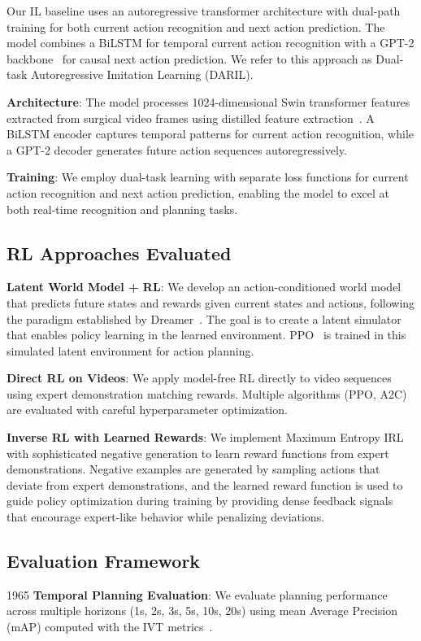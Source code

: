 \documentclass[runningheads]{llncs}
\begin{document}
Our IL baseline uses an autoregressive transformer architecture with dual-path training for both current action recognition and next action prediction. The model combines a BiLSTM for temporal current action recognition with a GPT-2 backbone~\cite{radford2019language} for causal next action prediction. We refer to this approach as Dual-task Autoregressive Imitation Learning (DARIL).

\textbf{Architecture}: The model processes 1024-dimensional Swin transformer features~\cite{liu2021swin} extracted from surgical video frames using distilled feature extraction~\cite{yamlahi2023self}. A BiLSTM encoder captures temporal patterns for current action recognition, while a GPT-2 decoder generates future action sequences autoregressively.

\textbf{Training}: We employ dual-task learning with separate loss functions for current action recognition and next action prediction, enabling the model to excel at both real-time recognition and planning tasks.

\subsection{RL Approaches Evaluated}

\textbf{Latent World Model + RL}: We develop an action-conditioned world model that predicts future states and rewards given current states and actions, following the paradigm established by Dreamer~\cite{hafner2020dream}. The goal is to create a latent simulator that enables policy learning in the learned environment. PPO~\cite{schulman2017proximal} is trained in this simulated latent environment for action planning.

\textbf{Direct RL on Videos}: We apply model-free RL directly to video sequences using expert demonstration matching rewards. Multiple algorithms (PPO, A2C) are evaluated with careful hyperparameter optimization.

\textbf{Inverse RL with Learned Rewards}: We implement Maximum Entropy IRL~\cite{ziebart2008maximum} with sophisticated negative generation to learn reward functions from expert demonstrations. Negative examples are generated by sampling actions that deviate from expert demonstrations, and the learned reward function is used to guide policy optimization during training by providing dense feedback signals that encourage expert-like behavior while penalizing deviations.

\subsection{Evaluation Framework}
1965
\textbf{Temporal Planning Evaluation}: We evaluate planning performance across multiple horizons (1s, 2s, 3s, 5s, 10s, 20s) using mean Average Precision (mAP) computed with the IVT metrics~\cite{nwoye2022data,nwoye2022cholect50}.
\end{document}
